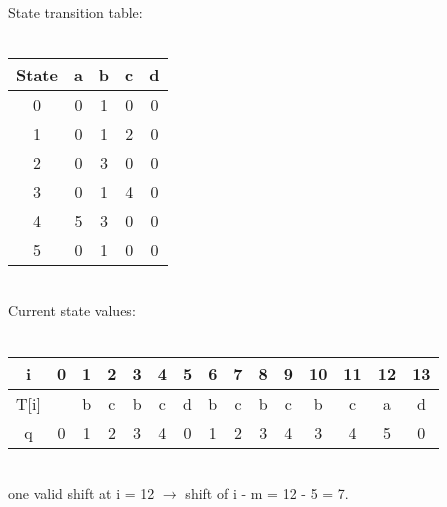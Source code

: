 \documentclass[12pt]{article}
\newenvironment{problem}[2][Problem]{\begin{trivlist}
\item[\hskip \labelsep {\bfseries #1}\hskip \labelsep {\bfseries #2.}]}{\end{trivlist}}
\begin{document}
\begin{problem}{1}
\\State transition table:\\\\
\begin{tabular}[b]{|c|c|c|c|c|} 
  \hline
  State & a & b & c & d \\
  \hline
  0 & 0 & 1 & 0 & 0\\
  \hline
  1 & 0 & 1 & 2 & 0\\
  \hline
  2 & 0 & 3 & 0 & 0\\
  \hline
  3 & 0 & 1 & 4 & 0\\
  \hline
  4 & 5 & 3 & 0 & 0\\
  \hline
  5 & 0 & 1 & 0 & 0\\
  \hline
\end{tabular}
\\Current state values:\\\\
\begin{tabular}[b]{|c|c|c|c|c|c|c|c|c|c|c|c|c|c|c|} 
  \hline
  i & 0 & 1 & 2 & 3 & 4 & 5 & 6 & 7 & 8 & 9 & 10 & 11 & 12 & 13 \\
  \hline
  T[i] &  & b & c & b & c & d & b & c & b & c & b & c & a & d\\
  \hline
  q & 0 & 1 & 2 & 3 & 4 & 0 & 1 & 2 & 3 & 4 & 3 & 4 & 5 & 0\\
  \hline
\end{tabular}
\\one valid shift at i = 12 $\rightarrow$ shift of i - m = 12 - 5 = 7.
\end{problem}

 
\end{document}
